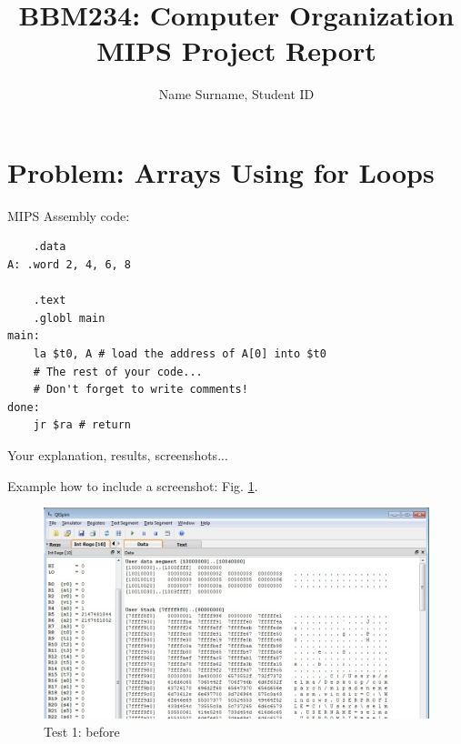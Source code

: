\documentclass[11pt]{article}
\begin{document}
%
\author{Name Surname, Student ID}
\title{BBM234: Computer Organization\\MIPS Project Report}
\maketitle

\section{Problem: Arrays Using for Loops}

MIPS Assembly code:

\begin{lstlisting}
	.data
A: .word 2, 4, 6, 8

	.text
	.globl main
main:
	la $t0, A # load the address of A[0] into $t0
	# The rest of your code...
	# Don't forget to write comments!
done:
	jr $ra # return
\end{lstlisting}

Your explanation, results, screenshots...

Example how to include a screenshot: Fig. \ref{fig:1test1bef}.
    
    
    \begin{figure}[h!]
            \centering
            \includegraphics[width=17cm]{screenshot.jpg}
            \caption{Test 1: before}
            \label{fig:1test1bef}
    \end{figure}
        
  
\clearpage
\newpage
\end{document}

